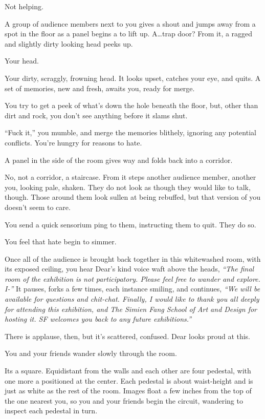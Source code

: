 Not helping.

A group of audience members next to you gives a shout and jumps away from a spot in the floor as a panel begins a to lift up. A\ldots{}trap door? From it, a ragged and slightly dirty looking head peeks up.

Your head.

Your dirty, scraggly, frowning head. It looks upset, catches your eye, and quits. A set of memories, new and fresh, awaits you, ready for merge.

You try to get a peek of what's down the hole beneath the floor, but, other than dirt and rock, you don't see anything before it slams shut.

``Fuck it,'' you mumble, and merge the memories blithely, ignoring any potential conflicts. You're hungry for reasons to hate.

A panel in the side of the room gives way and folds back into a corridor.

No, not a corridor, a staircase. From it steps another audience member, another you, looking pale, shaken. They do not look as though they would like to talk, though. Those around them look sullen at being rebuffed, but that version of you doesn't seem to care.

You send a quick sensorium ping to them, instructing them to quit. They do so.

You feel that hate begin to simmer.

Once all of the audience is brought back together in this whitewashed room, with its exposed ceiling, you hear Dear's kind voice waft above the heads, \emph{``The final room of the exhibition is not participatory. Please feel free to wander and explore. I-''} It pauses, forks a few times, each instance smiling, and continues, \emph{``We will be available for questions and chit-chat. Finally, I would like to thank you all deeply for attending this exhibition, and The Simien Fang School of Art and Design for hosting it. SF welcomes you back to any future exhibitions.''}

There is applause, then, but it's scattered, confused. Dear looks proud at this.

You and your friends wander slowly through the room.

Its a square. Equidistant from the walls and each other are four pedestal, with one more a positioned at the center. Each pedestal is about waist-height and is just as white as the rest of the room. Images float a few inches from the top of the one nearest you, so you and your friends begin the circuit, wandering to inspect each pedestal in turn.

